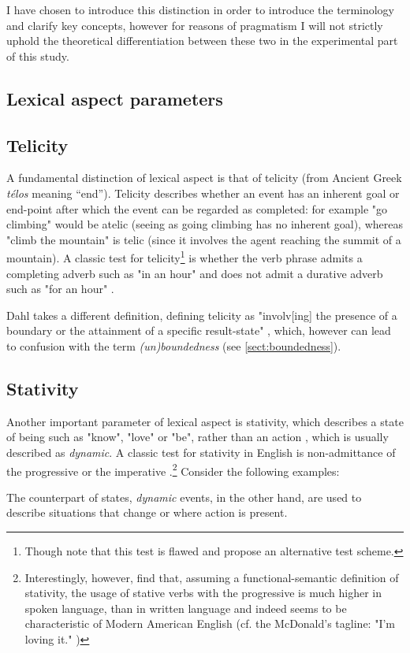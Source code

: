 I have chosen to introduce this distinction in order to introduce the terminology and clarify key concepts, however for reasons of pragmatism I will not strictly uphold the theoretical differentiation between these two in the experimental part of this study.

\subsection{Lexical aspect parameters}
\subsection*{Telicity}
A fundamental distinction of lexical aspect is that of telicity (from Ancient Greek \emph{télos} meaning “end”). Telicity describes whether an event has an inherent goal or end-point after which the event can be regarded as completed: for example "go climbing" would be atelic (seeing as going climbing has no inherent goal), whereas "climb the mountain" is telic (since it involves the agent reaching the summit of a mountain). A classic test for telicity\footnote{Though \citet{XiaoMcenery+2006+1+21} note that this test is flawed and propose an alternative test scheme.} is whether the verb phrase admits a completing adverb such as "in an hour" and does not admit a durative adverb such as "for an hour" \citep{Krifka1998TheOO}.

Dahl takes a different definition, defining telicity as "involv[ing] the presence of a boundary or the attainment of a specific result-state" \citep{DAHL2015210}, which, however can lead to confusion with the term \emph{(un)boundedness} (see \ref{sect:boundedness}).

\subsection*{Stativity}
Another important parameter of lexical aspect is stativity, which describes a state of being such as "know", "love" or "be", rather than an action \citep{binnick1991time}, which is usually described as \emph{dynamic}. A classic test for stativity in English is non-admittance of the progressive or the imperative \citep{McINTOSH+1975+35+42}.\footnote{Interestingly, however, \citet{Granath_Wherrity_2013} find that, assuming a functional-semantic definition of stativity, the usage of stative verbs with the progressive is much higher in spoken language, than in written language and indeed seems to be characteristic of Modern American English (cf. the McDonald's tagline: "I'm loving it." \citep{Freund2016RecentCI})} Consider the following examples:
\begin{exe}
\end{exe}
The counterpart of states, \emph{dynamic} events, in the other hand, are used to describe situations that change or where action is present.
